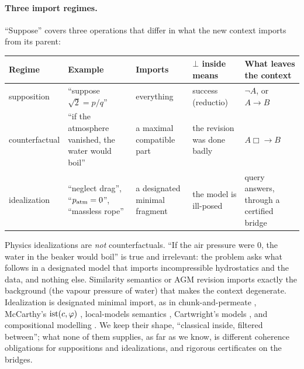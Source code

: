 \paragraph{Three import regimes.} ``Suppose'' covers three operations that differ in
what the new context imports from its parent:
\begin{center}\small
\begin{tabularx}{\textwidth}{@{}l>{\raggedright\arraybackslash}X>{\raggedright\arraybackslash}X>{\raggedright\arraybackslash}X>{\raggedright\arraybackslash}X@{}}
\toprule
Regime & Example & Imports & $\bot$ inside means & What leaves the context\\
\midrule
supposition & ``suppose $\sqrt2=p/q$'' & everything & success (reductio) & $\neg A$, or $A\to B$\\
counterfactual & ``if the atmosphere vanished, the water would boil'' & a maximal compatible part & the revision was done badly & $A\mathrel{\Box\!\!\to}B$\\
idealization & ``neglect drag'', ``$p_{\rm atm}=0$'', ``massless rope'' & a designated minimal fragment & the model is ill-posed & query answers, through a certified bridge\\
\bottomrule
\end{tabularx}
\end{center}
Physics idealizations are \emph{not} counterfactuals. ``If the air pressure were $0$,
the water in the beaker would boil'' is true and irrelevant: the problem asks what follows
in a designated model that imports incompressible hydrostatics and the data, and nothing
else. Similarity semantics
\citep{stalnaker1968theory,lewis1973counterfactuals} or AGM revision
\citep{alchourron1985logic} imports exactly the background (the vapour pressure of
water) that makes the context degenerate. Idealization is designated minimal import,
as in chunk-and-permeate \citep{brown2004chunk}, McCarthy's $\mathrm{ist}(c,\varphi)$
\citep{mccarthy1993notes}, local-models semantics \citep{ghidini2001local}, Cartwright's
models \citep{cartwright1983laws}, and compositional modelling
\citep{falkenhainer1991compositional}. We keep their shape, ``classical inside,
filtered between''; what none of them supplies, as far as we know, is different coherence
obligations for suppositions and idealizations, and rigorous certificates on the bridges.

